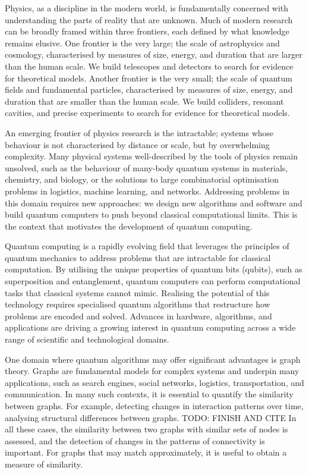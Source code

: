 Physics, as a discipline in the modern world, is fundamentally concerned with understanding the parts of reality that are unknown. Much of modern research can be broadly framed within three frontiers, each defined by what knowledge remains elusive. 
One frontier is the very large; the scale of astrophysics and cosmology, characterised by measures of size, energy, and duration that are larger than the human scale. We build telescopes and detectors to search for evidence for theoretical models. 
Another frontier is the very small; the scale of quantum fields and fundamental particles, characterised by measures of size, energy, and duration that are smaller than the human scale. We build colliders, resonant cavities, and precise experiments to search for evidence for theoretical models. 

An emerging frontier of physics research is the intractable; systems whose behaviour is not characterised by distance or scale, but by overwhelming complexity. Many physical systems well-described by the tools of physics remain unsolved, such as the behaviour of many-body quantum systems in materials, chemistry, and biology, or the solutions to large combinatorial optimisation problems in logistics, machine learning, and networks. Addressing problems in this domain requires new approaches: we design new algorithms and software and build quantum computers to push beyond classical computational limits. This is the context that motivates the development of quantum computing.

Quantum computing is a rapidly evolving field that leverages the principles of quantum mechanics to address problems that are intractable for classical computation. By utilising the unique properties of quantum bits (qubits), such as superposition and entanglement, quantum computers can perform computational tasks that classical systems cannot mimic. Realising the potential of this technology requires specialised quantum algorithms that restructure how problems are encoded and solved. Advances in hardware, algorithms, and applications are driving a growing interest in quantum computing across a wide range of scientific and technological domains.

One domain where quantum algorithms may offer significant advantages is graph theory.  Graphs are fundamental models for complex systems and underpin many applications, such as search engines, social networks, logistics, transportation, and communication. In many such contexts, it is essential to quantify the similarity between graphs.
For example, detecting changes in interaction patterns over time, analysing structural differences between graphs. TODO: FINISH AND CITE
In all these cases, the similarity between two graphs with similar sets of nodes is assessed, and the detection of changes in the patterns of connectivity is important. For graphs that may match approximately, it is useful to obtain a measure of similarity.

